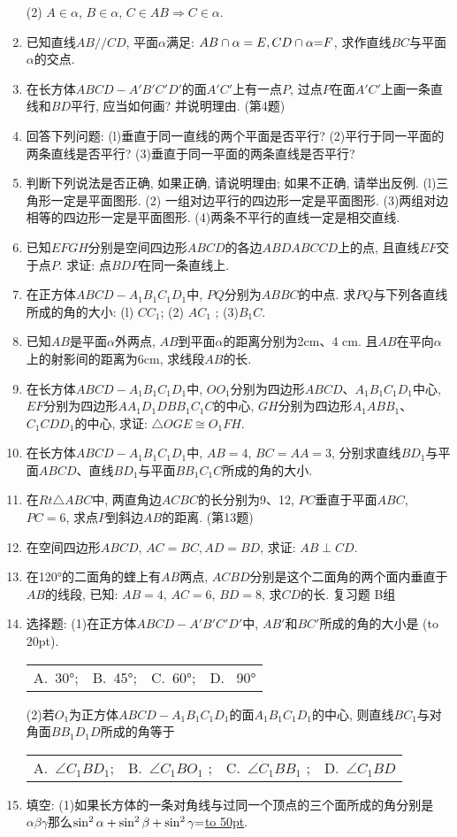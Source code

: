 \documentclass[10pt,a4paper]{article}
\newcommand{\blank}[1]{\underline{\hbox to #1pt{}}}
\newcommand{\bracket}[1]{(\hbox to #1pt{})}
\newcommand{\fourch}[4]{\par\begin{tabular}{p{.23\textwidth}p{.23\textwidth}p{.23\textwidth}p{.23\textwidth}}
A.~#1 &B.~#2& C.~#3& D.~#4
\end{tabular}}
\begin{document}
\begin{enumerate}[1.]
(2) $A\in \alpha$, $B\in \alpha$, $C\in AB\Rightarrow C\in \alpha$.
\item 已知直线$AB//CD$, 平面$\alpha$满足: $AB\cap \alpha =E,CD\cap \alpha \text=F$, 求作直线$BC$与平面$\alpha$的交点.
\item 在长方体$ABCD-A'B'C'D'$的面$A'C'$上有一点$P$, 过点$P$在面$A'C'$上画一条直线和$BD$平行, 应当如何画? 并说明理由.
(第4题)
\item 回答下列问题:
(l)垂直于同一直线的两个平面是否平行?
(2)平行于同一平面的两条直线是否平行?
(3)垂直于同一平面的两条直线是否平行?
\item 判断下列说法是否正确, 如果正确, 请说明理由; 如果不正确, 请举出反例.
(l)三角形一定是平面图形.
(2) 一组对边平行的四边形一定是平面图形.
(3)两组对边相等的四边形一定是平面图形.
(4)两条不平行的直线一定是相交直线.
\item 已知$EFGH$分别是空间四边形$ABCD$的各边$ABDABCCD$上的点, 且直线$EF$交于点$P$. 求证: 点$BDP$在同一条直线上.
\item 在正方体$ABCD-A_1B_1C_1D_1$中, $PQ$分别为$ABBC$的中点. 求$PQ$与下列各直线所成的角的大小:
(l) $CC_1$;  (2) $AC_1$ ; (3)$B_1C$.
\item 已知$AB$是平面$\alpha$外两点, $AB$到平面$\alpha$的距离分别为2cm、4 cm. 且$AB$在平向$\alpha$上的射影间的距离为6cm, 求线段$AB$的长.
\item 在长方体$ABCD-A_1B_1C_1D_1$中, $OO_1$分别为四边形$ABCD$、$A_1B_1C_1D_1$中心, $EF$分别为四边形$AA_1D_1DBB_1C_1C$的中心, $GH$分别为四边形$A_1ABB_1$、$C_1CDD_1$的中心, 求证: $\triangle OGE\cong O_1FH$.
\item 在长方体$ABCD-A_1B_1C_1D_1$中, $AB=4$, $BC=AA=3$, 分别求直线$BD_1$与平面$ABCD$、直线$BD_1$与平面$BB_1C_1C$所成的角的大小.
\item 在$Rt\triangle ABC$中, 两直角边$ACBC$的长分别为9、12, $PC$垂直于平面$ABC$, $PC=6$, 求点$P$到斜边$AB$的距离.
(第13题)
\item 在空间四边形$ABCD$, $AC=BC,AD=BD$, 求证: $AB\perp CD$.
\item 在120°的二面角的蝰上有$AB$两点, $ACBD$分别是这个二面角的两个面内垂直于$AB$的线段, 已知: $AB=4$, $AC=6$, $BD=8$, 求$CD$的长.
复习题
B组
\item 选择题:
(1)在正方体$ABCD-A'B'C'D'$中, $AB'$和$BC'$所成的角的大小是    \bracket{20}.
\fourch{30°;}{45°;}{60°;}{ 90°}
(2)若$O_1$为正方体$ABCD-A_1B_1C_1D_1$的面$A_1B_1C_1D_1$的中心, 则直线$BC_1$与对角面$BB_1D_1D$所成的角等于
\fourch{$\angle C_1BD_1$;}{$\angle C_1BO_1$ ;}{$\angle C_1BB_1$ ;}{$\angle C_1BD$}
\item 填空:
(1)如果长方体的一条对角线与过同一个顶点的三个面所成的角分别是$\alpha \beta \gamma$那么$\sin ^2\alpha +\sin ^2\beta +\sin ^2\gamma \text=$\blank{50}.

\end{enumerate}
\end{document}
